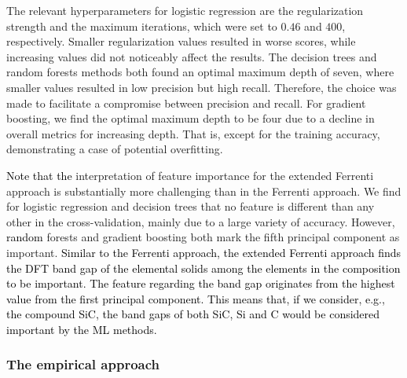 \documentclass[superscriptaddress,unsortedaddress,
 amsmath,amssymb,
 aps,
]{revtex4-2}
\newcommand{\mrk}[1]{\textcolor{black}{#1}}
\begin{document}
The relevant hyperparameters for logistic regression are the regularization strength and the maximum iterations, which were set to $0.46$ and $400$, respectively. Smaller regularization values resulted in worse scores, while increasing values did not noticeably affect the results. The decision trees and random forests methods both found an optimal maximum depth of seven, where smaller values resulted in low precision but high recall.  Therefore, the choice was made to facilitate a compromise between precision and recall. For gradient boosting, we find the optimal maximum depth to be four due to a decline in overall metrics for increasing depth.
That is, except for the training accuracy, demonstrating a case of potential overfitting.

\mrk{Note that the} interpretation of feature importance for the extended Ferrenti approach is substantially more challenging than in the Ferrenti approach. We find for logistic regression and decision trees that no feature is different than any other in the cross-validation, mainly due to a large variety of accuracy. However, \mrk{random} forests and gradient boosting both mark the fifth principal component as important. 
\mrk{Similar to the Ferrenti approach, the extended Ferrenti approach finds the DFT band gap of the elemental solids among the elements in the composition to be important. The feature regarding the band gap originates from the highest value from the first principal component. 
This means that, if we consider, e.g., the compound SiC, the band gaps of both SiC, Si and C would be considered important by the ML methods. 
} 

\subsubsection*{The empirical approach}
\end{document}
